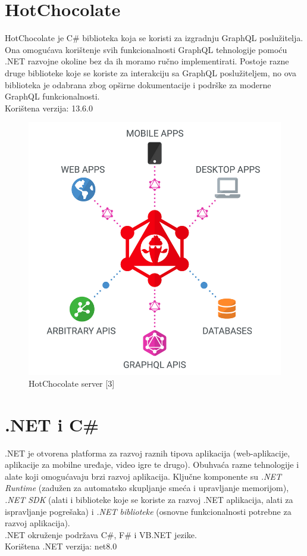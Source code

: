 \documentclass[zavrsnirad]{fer}
\begin{document}
\section{HotChocolate}
\label{pog:hotchocolate}
HotChocolate je C\# biblioteka koja se koristi za izgradnju GraphQL poslužitelja. Ona omogućava korištenje svih funkcionalnosti GraphQL tehnologije pomoću .NET razvojne okoline bez da ih moramo ručno implementirati. Postoje razne druge biblioteke koje se koriste za interakciju sa GraphQL poslužiteljem, no ova biblioteka je odabrana zbog opširne dokumentacije i podrške za moderne GraphQL funkcionalnosti.\\Korištena verzija: 13.6.0
\begin{figure}[htb]
	\centering
	\includegraphics[width=0.6\linewidth]{images/hot_chocolate.png} 
	\caption{HotChocolate server [3]}
	\label{slk:hot_chooclate}
\end{figure}
\FloatBarrier

\section{.NET i C\#}
.NET je otvorena platforma za razvoj raznih tipova aplikacija (web-aplikacije, aplikacije za mobilne uređaje, video igre te drugo). Obuhvaća razne tehnologije i alate koji omogućavaju brzi razvoj aplikacija. Ključne komponente su \textit{.NET Runtime} (zadužen za automatsko skupljanje smeća i upravljanje memorijom), \textit{.NET SDK} (alati i biblioteke koje se koriste za razvoj .NET aplikacija, alati za ispravljanje pogrešaka) i \textit{.NET biblioteke} (osnovne funkcionalnosti potrebne za razvoj aplikacija).
\\.NET okruženje podržava C\#, F\# i VB.NET jezike.
\\Korištena .NET verzija: net8.0
\end{document}
